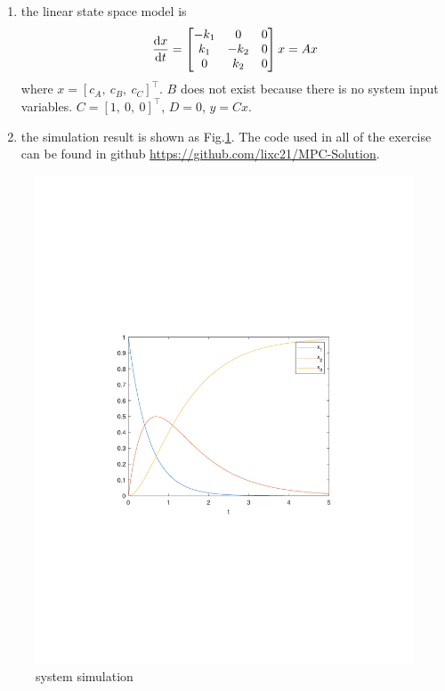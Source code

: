 \documentclass[11pt,a4paper]{report}
\theoremstyle{definition}\newtheorem{exercise}{Exercise}[chapter]
\begin{document}
\begin{answer}
\begin{enumerate}[label=(\alph*)]
    \item the linear state space model is
    \begin{equation}
        \dv{x}{t} = 
        \begin{bmatrix}
            -k_1 &0 &0 \\
            k_1 &-k_2 &0 \\
            0 &k_2 &0 \\
        \end{bmatrix} x = A x
    \end{equation}
    where $x=[c_A,\ c_B,\ c_C]^\top$. $B$ does not exist because there is no system input variables. $C=[1,\ 0,\ 0]^\top$, $D=0$, $y=Cx$.
    
    \item the simulation result is shown as Fig.\ref{fig:exer1-1}. The code used in all of the exercise can be found in github \url{https://github.com/lixc21/MPC-Solution}.
\end{enumerate}
\begin{figure}[htbp]
    \centering
    \includegraphics[width=\linewidth/2]{./code_ch1/exer1.pdf}
    \caption{system simulation}
    \label{fig:exer1-1}
\end{figure}
\end{answer}
\end{document}
